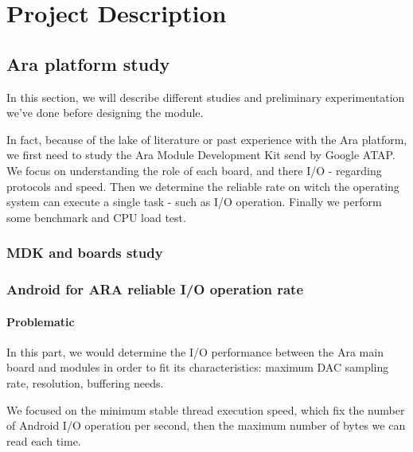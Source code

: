 
\chapter{Project Description}

\label{ProjectD}



\section{Ara platform study}

In this section, we will describe different studies and preliminary experimentation we've done before designing  the module.

In fact, because of the lake of literature or past experience with the Ara platform, we first need to study the Ara Module Development Kit send by Google ATAP. We focus on understanding the role of each board, and there I/O - regarding protocols and speed. Then we determine the reliable rate on witch the operating system can execute a single task - such as I/O operation. Finally we perform some benchmark and CPU load test. 

\subsection{MDK and boards study}

\subsection{Android for ARA reliable I/O operation rate}  \label{result-ara}

\subsubsection{Problematic}

In this part, we would determine the I/O performance between the Ara main board and  modules in order to fit its characteristics: maximum DAC sampling rate, resolution, buffering needs.

We focused on the minimum stable thread execution speed, which fix the number of Android I/O operation per second, then the maximum number of bytes we can read each time.

